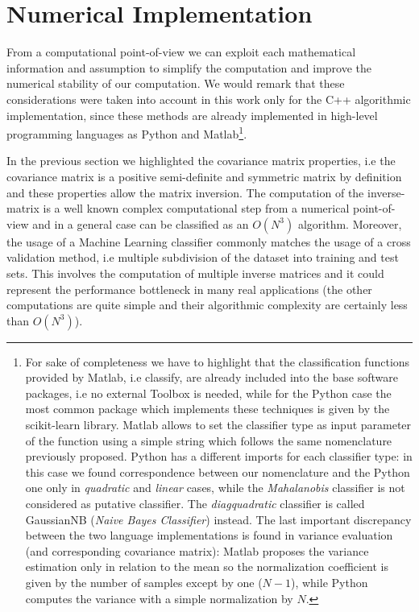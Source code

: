 \documentclass{standalone}
\begin{document}
\section*{Numerical Implementation}

From a computational point-of-view we can exploit each mathematical information and assumption to simplify the computation and improve the numerical stability of our computation.
We would remark that these considerations were taken into account in this work only for the \textsf{C++} algorithmic implementation, since these methods are already implemented in high-level programming languages as \textsf{Python} and \textsf{Matlab}\footnote{
  For sake of completeness we have to highlight that the classification functions provided by \textsf{Matlab}, i.e \textsf{classify}, are already included into the base software packages, i.e no external Toolbox is needed, while for the \textsf{Python} case the most common package which implements these techniques is given by the \textsf{scikit-learn} library.
  \textsf{Matlab} allows to set the classifier type as input parameter of the function using a simple string which follows the same nomenclature previously proposed.
  \textsf{Python} has a different imports for each classifier type: in this case we found correspondence between our nomenclature and the \textsf{Python} one only in \emph{quadratic} and \emph{linear} cases, while the \emph{Mahalanobis} classifier is not considered as putative classifier.
  The \emph{diagquadratic} classifier is called \textsf{GaussianNB} (\emph{Naive Bayes Classifier}) instead.
  The last important discrepancy between the two language implementations is found in variance evaluation (and corresponding covariance matrix): \textsf{Matlab} proposes the variance estimation only in relation to the mean so the normalization coefficient is given by the number of samples except by one ($N-1$), while \textsf{Python} computes the variance with a simple normalization by $N$.
}.

In the previous section we highlighted the covariance matrix properties, i.e the covariance matrix is a positive semi-definite and symmetric matrix by definition and these properties allow the matrix inversion.
The computation of the inverse-matrix is a well known complex computational step from a numerical point-of-view and in a general case can be classified as an $O(N^3)$ algorithm.
Moreover, the usage of a Machine Learning classifier commonly matches the usage of a cross validation method, i.e multiple subdivision of the dataset into training and test sets.
This involves the computation of multiple inverse matrices and it could represent the performance bottleneck in many real applications (the other computations are quite simple and their algorithmic complexity are certainly less than $O(N^3)$).
\end{document}
